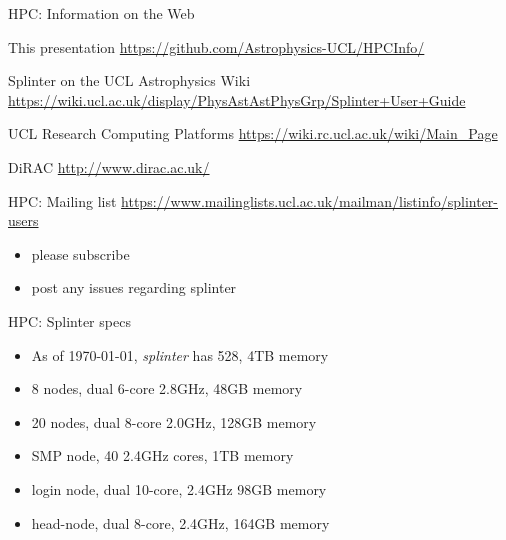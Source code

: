 \documentclass{beamer}
\begin{document}
\begin{frame}{HPC: Information on the Web}
  \begin{block}{This presentation}
    \url{https://github.com/Astrophysics-UCL/HPCInfo/}
  \end{block}

    \begin{block}{Splinter on the UCL Astrophysics Wiki}
    \url{https://wiki.ucl.ac.uk/display/PhysAstAstPhysGrp/Splinter+User+Guide}
  \end{block}

  \begin{block}{UCL Research Computing Platforms}
    \url{https://wiki.rc.ucl.ac.uk/wiki/Main_Page}
  \end{block}

  \begin{block}{DiRAC}
    \url{http://www.dirac.ac.uk/}
  \end{block}

\end{frame}

\begin{frame}{HPC: Mailing list}
	\url{https://www.mailinglists.ucl.ac.uk/mailman/listinfo/splinter-users}
	\bigskip
	\begin{itemize}
		\item please subscribe
		\item post any issues regarding splinter
	\end{itemize}
\end{frame}

\begin{frame}{HPC: Splinter specs}
	\begin{itemize}
		\item As of \today, \emph{splinter} has 528, 4TB memory
		\item 8 nodes, dual 6-core 2.8GHz, 48GB memory 
		\item 20 nodes, dual 8-core 2.0GHz, 128GB memory
		\item SMP node, 40 2.4GHz cores, 1TB memory
		\item login node, dual 10-core, 2.4GHz 98GB memory
		\item head-node, dual 8-core, 2.4GHz, 164GB memory
	\end{itemize}
\end{frame}
\end{document}
